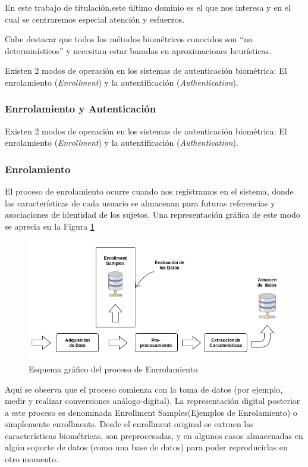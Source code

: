En  este  trabajo de  titulación,este  último dominio es el  que nos interesa y  en el  cual  se  centraremos especial  atención y esfuerzos.

Cabe destacar que todos los métodos biométricos conocidos son ``no determinísticos'' y necesitan estar basadas en aproximaciones heurísticas.

Existen 2 modos de operación en los sistemas de autenticación biométrica: El enrolamiento (\textit{Enrollment}) y la autentificación (\textit{Authentication}).

\subsubsection{Enrrolamiento y Autenticación}


Existen 2 modos de operación en los sistemas de autenticación biométrica: El enrolamiento (\textit{Enrollment}) y la autentificación (\textit{Authentication}).


\subsubsection*{Enrolamiento}

El proceso de enrolamiento ocurre cuando nos registramos en el sistema, donde las características de cada usuario se almacenan para futuras referencias y asociaciones de identidad de los sujetos. Una representación gráfica de este modo se aprecia en la Figura \ref{enrrolamiento}

\begin{figure}[H]
\centering
\includegraphics[scale=0.5]{images/capitulo2/enrrolamiento.png}
\caption{Esquema gráfico del proceso  de Enrrolamiento}
\label{enrrolamiento}
\end{figure}

Aquí se observa que el proceso comienza con la toma de datos (por ejemplo, medir y realizar conversiones análogo-digital). La representación digital posterior a este proceso es denominada Enrollment Samples(Ejemplos de Enrolamiento) o simplemente enrollments. Desde el enrollment original se extraen las características biométricas, son preprocesadas, y en algunos casos almacenadas en algún soporte de datos (como una base de datos) para poder reproducirlas en otro momento.


